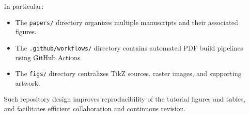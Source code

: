 \documentclass[conference]{IEEEtran}
\begin{document}
In particular:
\begin{itemize}
  \item The \texttt{papers/} directory organizes multiple manuscripts and 
        their associated figures.
  \item The \texttt{.github/workflows/} directory contains automated 
        PDF build pipelines using GitHub Actions.
  \item The \texttt{figs/} directory centralizes TikZ sources, raster 
        images, and supporting artwork.
\end{itemize}

Such repository design improves reproducibility of the tutorial figures 
and tables, and facilitates efficient collaboration and continuous 
revision.

\end{document}
